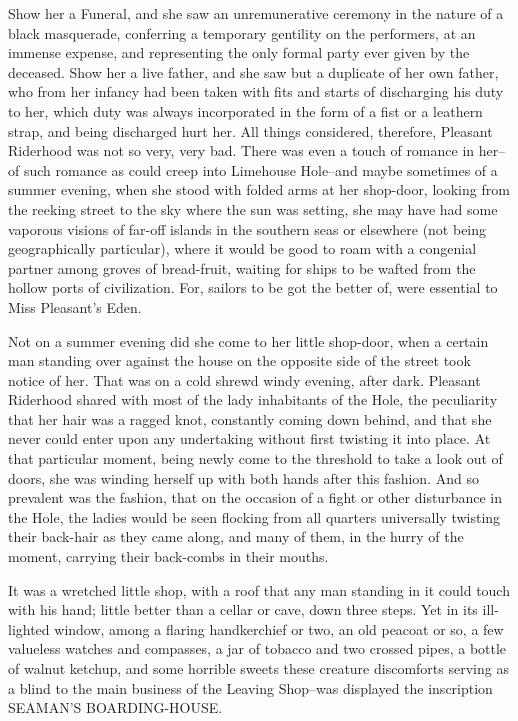 Show her a Funeral, and she saw an
unremunerative ceremony in the nature of a black masquerade, conferring
a temporary gentility on the performers, at an immense expense, and
representing the only formal party ever given by the deceased. Show her
a live father, and she saw but a duplicate of her own father, who from
her infancy had been taken with fits and starts of discharging his duty
to her, which duty was always incorporated in the form of a fist or a
leathern strap, and being discharged hurt her. All things considered,
therefore, Pleasant Riderhood was not so very, very bad. There was even
a touch of romance in her--of such romance as could creep into Limehouse
Hole--and maybe sometimes of a summer evening, when she stood with
folded arms at her shop-door, looking from the reeking street to the
sky where the sun was setting, she may have had some vaporous visions
of far-off islands in the southern seas or elsewhere (not being
geographically particular), where it would be good to roam with a
congenial partner among groves of bread-fruit, waiting for ships to be
wafted from the hollow ports of civilization. For, sailors to be got the
better of, were essential to Miss Pleasant’s Eden.

Not on a summer evening did she come to her little shop-door, when a
certain man standing over against the house on the opposite side of
the street took notice of her. That was on a cold shrewd windy evening,
after dark. Pleasant Riderhood shared with most of the lady inhabitants
of the Hole, the peculiarity that her hair was a ragged knot, constantly
coming down behind, and that she never could enter upon any undertaking
without first twisting it into place. At that particular moment, being
newly come to the threshold to take a look out of doors, she was winding
herself up with both hands after this fashion. And so prevalent was the
fashion, that on the occasion of a fight or other disturbance in the
Hole, the ladies would be seen flocking from all quarters universally
twisting their back-hair as they came along, and many of them, in the
hurry of the moment, carrying their back-combs in their mouths.

It was a wretched little shop, with a roof that any man standing in it
could touch with his hand; little better than a cellar or cave, down
three steps. Yet in its ill-lighted window, among a flaring handkerchief
or two, an old peacoat or so, a few valueless watches and compasses, a
jar of tobacco and two crossed pipes, a bottle of walnut ketchup, and
some horrible sweets these creature discomforts serving as a blind to
the main business of the Leaving Shop--was displayed the inscription
SEAMAN’S BOARDING-HOUSE.

